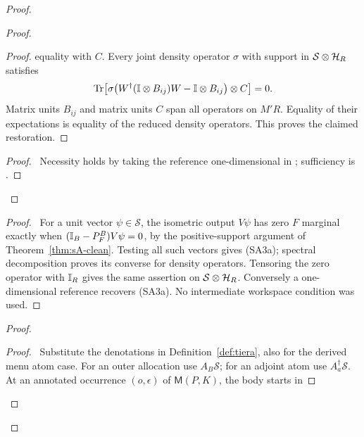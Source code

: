 \begin{proof}
\begin{proof}
\begin{proof}
  equality with $C$. Every joint density operator $\sigma$ with support
  in $\mathcal S\otimes\mathcal{H}_R$ satisfies
  \[
   \operatorname{Tr}\!\left[\sigma\bigl(W^\dagger(\mathbb{I}\otimes B_{ij})W
          -\mathbb{I}\otimes B_{ij}\bigr)\otimes C\right]=0.
  \]
  Matrix units $B_{ij}$ and matrix units $C$ span all operators on
  $M'R$. Equality of their expectations is equality of the reduced
  density operators. This proves the claimed restoration.
  \end{proof}
  \qedstep
  \begin{proof}\pf\ Necessity holds by taking the reference
  one-dimensional in ; sufficiency is
  .
  \end{proof}
 \end{proof}
 \begin{proof}\pf\ For a unit vector $\psi\in\mathcal S$, the
 isometric output $V\psi$ has zero $F$ marginal exactly when
 $(\mathbb{I}_B-P_F^B)V\psi=0$, by the positive-support argument of
 Theorem~\ref{thm:sA-clean}. Testing all such vectors gives (SA3a);
 spectral decomposition proves its converse for density operators.
 Tensoring the zero operator with $\mathbb{I}_R$ gives the same assertion
 on $\mathcal S\otimes\mathcal{H}_R$. Conversely a one-dimensional reference
 recovers (SA3a). No intermediate workspace condition was used.
 \end{proof}
 \begin{proof}
  \begin{proof}\pf\ Substitute the denotations in
  Definition~\ref{def:tiera}, also for the derived menu atom case.
  For an outer allocation use $A_B\mathcal S$; for an adjoint atom
  use $A_a^\dagger\mathcal S$. At an annotated occurrence
  $(o,\epsilon)$ of $\mathsf M(P,K)$, the body starts in

\end{proof}
\end{proof}
\end{proof}
